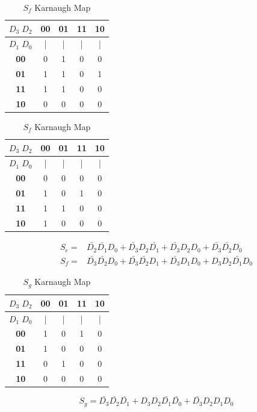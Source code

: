 \documentclass{article}
\begin{document}
\begin{table}[H]
  \centering
  \begin{minipage}{0.45\textwidth}
  \centering
  \begin{tabular}{|c|c|c|c|c|}
  \hline
  \textbf{$D_3 \; D_2$} & \textbf{00} & \textbf{01} & \textbf{11} & \textbf{10} \\
  \hline
  \textbf{$D_1 \; D_0$} & | & | & | & | \\
  \hline
  \textbf{00} & 0 & 1 & 0 & 0 \\
  \hline
  \textbf{01} & 1 & 1 & 0 & 1 \\
  \hline
  \textbf{11} & 1 & 1 & 0 & 0 \\
  \hline
  \textbf{10} & 0 & 0 & 0 & 0 \\
  \hline
  \end{tabular}
  \caption{$S_e$ Karnaugh Map}
  \end{minipage}
  \hfill
  \begin{minipage}{0.45\textwidth}
  \centering
  \begin{tabular}{|c|c|c|c|c|}
  \hline
  \textbf{$D_3 \; D_2$} & \textbf{00} & \textbf{01} & \textbf{11} & \textbf{10} \\
  \hline
  \textbf{$D_1 \; D_0$} & | & | & | & | \\
  \hline
  \textbf{00} & 0 & 0 & 0 & 0 \\
  \hline
  \textbf{01} & 1 & 0 & 1 & 0 \\
  \hline
  \textbf{11} & 1 & 1 & 0 & 0 \\
  \hline
  \textbf{10} & 1 & 0 & 0 & 0 \\
  \hline
  \end{tabular}
  \caption{$S_f$ Karnaugh Map}
  \end{minipage}
\end{table}
\begin{align*}
  S_e =& \bar{D_2}\bar{D_1}D_0+\bar{D_3}D_2\bar{D_1}+\bar{D_3}D_2D_0+\bar{D_3}\bar{D_2}D_0\\
  S_f =& \bar{D_3}\bar{D_2}D_0+\bar{D_3}\bar{D_2}D_1+\bar{D_3}D_1D_0+D_3D_2\bar{D_1}D_0
\end{align*}

\begin{table}[H]
\centering
\begin{tabular}{|c|c|c|c|c|}
\hline
\textbf{$D_3 \; D_2$} & \textbf{00} & \textbf{01} & \textbf{11} & \textbf{10} \\
\hline
\textbf{$D_1 \; D_0$} & | & | & | & | \\
\hline
\textbf{00} & 1 & 0 & 1 & 0 \\
\hline
\textbf{01} & 1 & 0 & 0 & 0 \\
\hline
\textbf{11} & 0 & 1 & 0 & 0 \\
\hline
\textbf{10} & 0 & 0 & 0 & 0 \\
\hline
\end{tabular}
\caption{$S_g$ Karnaugh Map}
\end{table}
\begin{equation*}
  S_g = \bar{D_3}\bar{D_2}\bar{D_1}+D_3D_2\bar{D_1}\bar{D_0}+\bar{D_3}D_2D_1D_0
\end{equation*}
\end{document}
